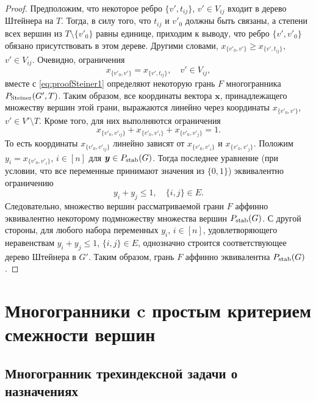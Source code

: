 \begin{proof}
	Предположим, что некоторое ребро $\{v', t_{ij}\}$, $v' \in V_{ij}$ входит в дерево Штейнера на $T$. 
	Тогда, в силу того, что $t_{ij}$ и $v'_0$ должны быть связаны, а степени всех вершин из $T \setminus \{v'_0\}$ равны единице, приходим к выводу, что ребро $\{v', v'_0\}$ обязано присутствовать в этом дереве.
	Другими словами, $x_{\{v'_0, v'\}} \ge x_{\{v', t_{ij}\}}$, $v' \in V_{ij}$.
	Очевидно, ограничения 
	\[
	x_{\{v'_0, v'\}} = x_{\{v', t_{ij}\}}, \quad v' \in V_{ij},
	\]
	вместе с \eqref{eq:proofSteiner1} определяют некоторую грань $F$ многогранника $P_{\textup{Steiner}}(G',T)$.
	Таким образом, все координаты вектора $\bm{x}$, принадлежащего множеству вершин этой грани, выражаются линейно через координаты $x_{\{v'_0, v'\}}$, $v' \in V' \setminus T$.
	Кроме того, для них выполняются ограничения
	\begin{equation*}
	x_{\{v'_0, v'_{ij}\}} + x_{\{v'_0, v'_{i}\}} + x_{\{v'_0, v'_{j}\}} = 1.
	\end{equation*}
	То есть координаты $x_{\{v'_0, v'_{ij}\}}$ линейно зависят от $x_{\{v'_0, v'_{i}\}}$ и $x_{\{v'_0, v'_{j}\}}$. Положим $y_i = x_{\{v'_0, v'_{i}\}}$, $i \in [n]$ для $\bm{y} \in P_{\textup{stab}}(G)$. Тогда последнее уравнение (при условии, что все переменные принимают значения из $\{0,1\}$) эквивалентно ограничению
	\begin{equation*}
	y_i + y_j \le 1, \quad \{i,j\} \in E.
	\end{equation*}
	Следовательно, множество вершин рассматриваемой грани $F$ аффинно эквивалентно некоторому подмножеству множества вершин $P_{\textup{stab}}(G)$. С другой стороны, для любого набора переменных $y_i$, $i \in [n]$, удовлетворяющего неравенствам $y_i + y_j \le 1$, $\{i,j\} \in E$, однозначно строится соответствующее дерево Штейнера в $G'$. Таким образом, грань $F$ аффинно эквивалентна $P_{\textup{stab}}(G)$.
\end{proof}



%
%

\section{Многогранники c простым критерием смежности вершин}
\label{sec:PolytopesSimpleAdj}

\subsection{Многогранник трехиндексной задачи о назначениях}
\label{sec:3Ass}

